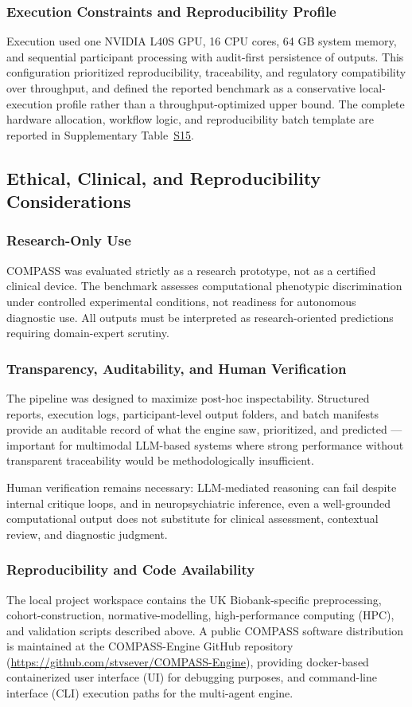 \documentclass[11pt,a4paper,twoside]{article}
\begin{document}
\subsubsection{Execution Constraints and Reproducibility Profile}
Execution used one NVIDIA L40S GPU, 16 CPU cores, 64 GB system memory, and sequential participant processing with audit-first persistence of outputs. This configuration prioritized reproducibility, traceability, and regulatory compatibility over throughput, and defined the reported benchmark as a conservative local-execution profile rather than a throughput-optimized upper bound. The complete hardware allocation, workflow logic, and reproducibility batch template are reported in Supplementary Table~\hyperref[tab:s15]{S15}.

\subsection{Ethical, Clinical, and Reproducibility Considerations}
\subsubsection{Research-Only Use}
COMPASS was evaluated strictly as a research prototype, not as a certified clinical device. The benchmark assesses computational phenotypic discrimination under controlled experimental conditions, not readiness for autonomous diagnostic use. All outputs must be interpreted as research-oriented predictions requiring domain-expert scrutiny.

\subsubsection{Transparency, Auditability, and Human Verification}
The pipeline was designed to maximize post-hoc inspectability. Structured reports, execution logs, participant-level output folders, and batch manifests provide an auditable record of what the engine saw, prioritized, and predicted --- important for multimodal LLM-based systems where strong performance without transparent traceability would be methodologically insufficient.

Human verification remains necessary: LLM-mediated reasoning can fail despite internal critique loops, and in neuropsychiatric inference, even a well-grounded computational output does not substitute for clinical assessment, contextual review, and diagnostic judgment.

\subsubsection{Reproducibility and Code Availability}
The local project workspace contains the UK Biobank-specific preprocessing, cohort-construction, normative-modelling, high-performance computing (HPC), and validation scripts described above. A public COMPASS software distribution is maintained at the COMPASS-Engine GitHub repository (\url{https://github.com/stvsever/COMPASS-Engine}), providing docker-based containerized user interface (UI) for debugging purposes, and command-line interface (CLI) execution paths for the multi-agent engine.
\end{document}
